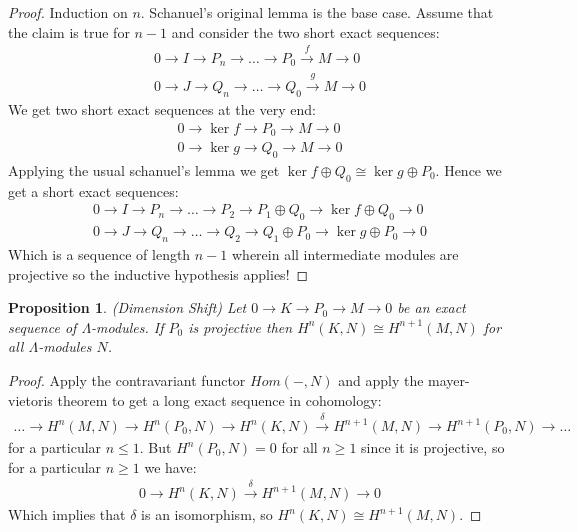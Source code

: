 \documentclass[12pt]{book}
\newtheorem{proposition}[theorem]{Proposition}
\theoremstyle{definition}
\begin{document}
\begin{proof}
    Induction on $n$. Schanuel's original lemma is the base case. Assume that the claim is true for $n-1$ and consider the two short exact sequences: 
    \begin{align*}
        0 \rightarrow I \rightarrow P_n \rightarrow \dots \rightarrow P_0 \xrightarrow{f} M \rightarrow 0\\
        0 \rightarrow J \rightarrow Q_n \rightarrow \dots \rightarrow Q_0 \xrightarrow{g} M \rightarrow 0
    \end{align*}
    We get two short exact sequences at the very end:
    \begin{align*}
        0 \rightarrow \ker f \rightarrow P_0 \rightarrow M \rightarrow 0 \\
        0 \rightarrow \ker g \rightarrow Q_0 \rightarrow M \rightarrow 0
    \end{align*}
    Applying the usual schanuel's lemma we get $\ker f \oplus Q_0 \cong \ker g \oplus P_0$. Hence we get a short exact sequences: 
    \begin{align*}
        0 \rightarrow I \rightarrow P_n \rightarrow \dots \rightarrow P_2 \rightarrow P_1 \oplus Q_0 \rightarrow \ker f \oplus Q_0 \rightarrow 0\\
        0 \rightarrow J \rightarrow Q_n \rightarrow \dots \rightarrow Q_2 \rightarrow Q_1 \oplus P_0 \rightarrow \ker g \oplus P_0 \rightarrow 0
    \end{align*}
    Which is a sequence of length $n-1$ wherein all intermediate modules are projective so the inductive hypothesis applies!
\end{proof}

\begin{proposition}(Dimension Shift) \label{DimShift}
    Let $0 \rightarrow K \rightarrow P_0 \rightarrow M \rightarrow 0$ be an exact sequence of $\Lambda$-modules. If $P_0$ is projective then $H^n(K,N) \cong H^{n+1}(M,N)$ for all $\Lambda$-modules $N$. 
\end{proposition}
\begin{proof}
    Apply the contravariant functor $Hom(-, N)$ and apply the mayer-vietoris theorem to get a long exact sequence in cohomology: 
    \begin{align*}
        \dots \rightarrow H^n(M,N) \rightarrow H^n(P_0, N) \rightarrow H^n(K,N) \xrightarrow{\delta} H^{n+1}(M,N) \rightarrow H^{n+1}(P_0, N) \rightarrow \dots
    \end{align*}
    for a particular $n \leq 1$. But $H^n(P_0, N) = 0$ for all $n \geq 1$ since it is projective, so for a particular $n \geq 1$ we have: 
    \begin{align*}
        0 \rightarrow H^n(K,N) \xrightarrow{\delta} H^{n+1}(M,N) \rightarrow 0
    \end{align*}
    Which implies that $\delta$ is an isomorphism, so $H^n(K,N) \cong H^{n+1}(M,N)$.  
\end{proof}
\end{document}
